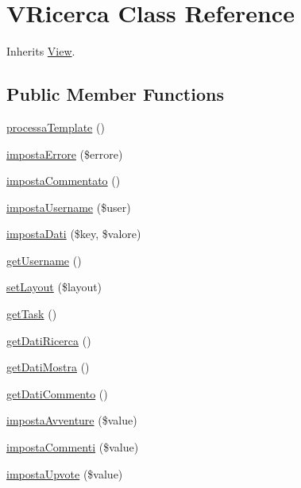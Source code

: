 \hypertarget{class_v_ricerca}{}\section{V\+Ricerca Class Reference}
\label{class_v_ricerca}


Inherits \mbox{\hyperlink{class_view}{View}}.

\subsection*{Public Member Functions}
\begin{DoxyCompactItemize}
\item 
\mbox{\hyperlink{class_v_ricerca_a64bdc484fc7074989b4b2c0ebc63aec2}{processa\+Template}} ()
\item 
\mbox{\hyperlink{class_v_ricerca_acb9fd807e8b09b46b95fc55b65edeb36}{imposta\+Errore}} (\$errore)
\item 
\mbox{\hyperlink{class_v_ricerca_ae9e869a3b6923a4f044dbb4e16c41ff3}{imposta\+Commentato}} ()
\item 
\mbox{\hyperlink{class_v_ricerca_ab16a8f6e348cc54284c9a57bf5d3621e}{imposta\+Username}} (\$user)
\item 
\mbox{\hyperlink{class_v_ricerca_ab3c0dc76f35667b7a13404d03b7fdb36}{imposta\+Dati}} (\$key, \$valore)
\item 
\mbox{\hyperlink{class_v_ricerca_a81b37a3c9d639574e394f80c1138c75e}{get\+Username}} ()
\item 
\mbox{\hyperlink{class_v_ricerca_a702b3376618a26e6c02c05bae65c6b9e}{set\+Layout}} (\$layout)
\item 
\mbox{\hyperlink{class_v_ricerca_a13871c4434338f02d6f8d430fa0597f2}{get\+Task}} ()
\item 
\mbox{\hyperlink{class_v_ricerca_a0867be22250ee77c1059627deb1333ef}{get\+Dati\+Ricerca}} ()
\item 
\mbox{\hyperlink{class_v_ricerca_a21c1b6e37828f68cadec73d5fe012eef}{get\+Dati\+Mostra}} ()
\item 
\mbox{\hyperlink{class_v_ricerca_abe042c7ec0bf0e26f8b6d97855ffe723}{get\+Dati\+Commento}} ()
\item 
\mbox{\hyperlink{class_v_ricerca_afcbe39b7f4848575a8fbe4e18c7261b5}{imposta\+Avventure}} (\$value)
\item 
\mbox{\hyperlink{class_v_ricerca_af9ae17e04de66b81a9f3590989e13234}{imposta\+Commenti}} (\$value)
\item 
\mbox{\hyperlink{class_v_ricerca_ab8847e349586a6d30c71143e8c96d14b}{imposta\+Upvote}} (\$value)
\end{DoxyCompactItemize}
